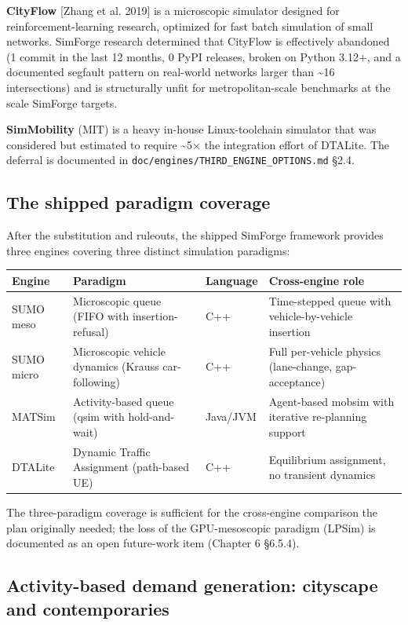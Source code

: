 \textbf{CityFlow} {[}Zhang et al. 2019{]} is a microscopic simulator
designed for reinforcement-learning research, optimized for fast batch
simulation of small networks. SimForge research determined that CityFlow
is effectively abandoned (1 commit in the last 12 months, 0 PyPI
releases, broken on Python 3.12+, and a documented segfault pattern on
real-world networks larger than \textasciitilde16 intersections) and is
structurally unfit for metropolitan-scale benchmarks at the scale
SimForge targets.

\textbf{SimMobility} (MIT) is a heavy in-house Linux-toolchain simulator
that was considered but estimated to require \textasciitilde5× the
integration effort of DTALite. The deferral is documented in
\texttt{doc/engines/THIRD\_ENGINE\_OPTIONS.md} §2.4.

\subsection{The shipped paradigm
coverage}\label{233-the-shipped-paradigm-coverage}

After the substitution and ruleouts, the shipped SimForge framework
provides three engines covering three distinct simulation paradigms:

\begin{longtable}[]{@{}llll@{}}
\toprule\noalign{}
Engine & Paradigm & Language & Cross-engine role \\
\midrule\noalign{}
\endhead
\bottomrule\noalign{}
\endlastfoot
SUMO meso & Microscopic queue (FIFO with insertion-refusal) & C++ &
Time-stepped queue with vehicle-by-vehicle insertion \\
SUMO micro & Microscopic vehicle dynamics (Krauss car-following) & C++ &
Full per-vehicle physics (lane-change, gap-acceptance) \\
MATSim & Activity-based queue (qsim with hold-and-wait) & Java/JVM &
Agent-based mobsim with iterative re-planning support \\
DTALite & Dynamic Traffic Assignment (path-based UE) & C++ & Equilibrium
assignment, no transient dynamics \\
\end{longtable}

The three-paradigm coverage is sufficient for the cross-engine
comparison the plan originally needed; the loss of the
GPU-mesoscopic paradigm (LPSim) is documented as an open future-work
item (Chapter 6 §6.5.4).

\subsection{Activity-based demand generation: cityscape and
contemporaries}\label{234-activity-based-demand-generation-cityscape-and-contemporaries}

